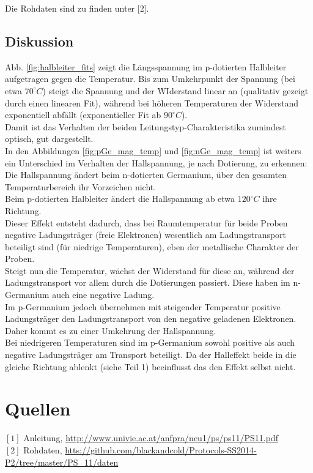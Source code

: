 \documentclass[12pt,a4paper]{article}
\begin{document}
\begin{multicols}{2}



\noindent Die Rohdaten sind zu finden unter [2].

\subsection{Diskussion}

Abb. \ref{fig:halbleiter_fits} zeigt die Längsspannung im p-dotierten Halbleiter aufgetragen gegen die Temperatur. Bis zum Umkehrpunkt der Spannung (bei etwa $70^\circ C$) steigt die Spannung und der WIderstand linear an (qualitativ gezeigt durch einen linearen Fit), während bei höheren Temperaturen der Widerstand exponentiell abfällt (exponentieller Fit ab $90^\circ C$).\\
Damit ist das Verhalten der beiden Leitungstyp-Charakteristika zumindest optisch, gut dargestellt.\\

In den Abbildungen \ref{fig:pGe_mag_temp} und \ref{fig:nGe_mag_temp} ist weiters ein Unterschied im Verhalten der Hallspannung, je nach Dotierung, zu erkennen:\\
Die Hallspannung ändert beim n-dotierten Germanium, über den gesamten Temperaturbereich ihr Vorzeichen nicht.\\
Beim p-dotierten Halbleiter ändert die Hallspannung ab etwa $120^\circ C$ ihre Richtung.\\
Dieser Effekt entsteht dadurch, dass bei Raumtemperatur für beide Proben negative Ladungsträger (freie Elektronen) wesentlich am Ladungstransport beteiligt sind (für niedrige Temperaturen), eben der metallische Charakter der Proben.\\
Steigt nun die Temperatur, wächst der Widerstand für diese an, während der Ladungstransport vor allem durch die Dotierungen passiert. Diese haben im n-Germanium auch eine negative Ladung.\\
Im p-Germanium jedoch übernehmen mit steigender Temperatur positive Ladungsträger den Ladungstransport von den negative geladenen Elektronen. Daher kommt es zu einer Umkehrung der Hallspannung.\\

Bei niedrigeren Temperaturen sind im p-Germanium sowohl positive als auch negative Ladungsträger am Transport beteiligt. Da der Halleffekt beide in die gleiche Richtung ablenkt (siehe Teil 1) beeinflusst das den Effekt selbst nicht.


\section{Quellen}
$[1]$ Anleitung, \url{http://www.univie.ac.at/anfpra/neu1/ps/ps11/PS11.pdf}\\
$[2]$ Rohdaten, \url{htts://github.com/blackandcold/Protocols-SS2014-P2/tree/master/PS_11/daten}\\

\end{multicols}
\end{document}
